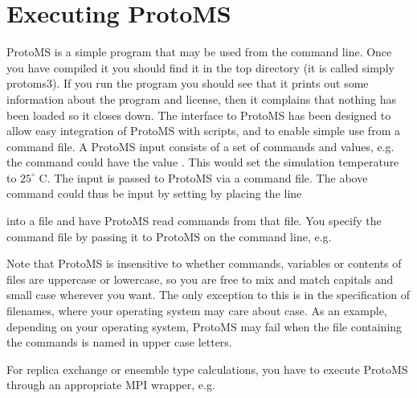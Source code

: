 \documentclass[letterpaper,10pt,english]{sphinxmanual}
\begin{document}
\chapter{Executing ProtoMS}
\label{\detokenize{protoms:executing-protoms}}
ProtoMS is a simple program that may be used from the command line. Once you have compiled it you should find it in the top directory (it is called simply protoms3). If you run the program you should see that it prints out some information about the program and license, then it complains that nothing has been loaded so it closes down. The interface to ProtoMS has been designed to allow easy integration of ProtoMS with scripts, and to enable simple use from a command file. A ProtoMS input consists of a set of commands and values, e.g. the command  could have the value  . This would set the simulation temperature to \(25^\circ\) C. The input is passed to ProtoMS via a command file. The above command could thus be input by setting by placing the line

%
\begin{sphinxVerbatim}[commandchars=\\\{\}]
 
\end{sphinxVerbatim}

into a file and have ProtoMS read commands from that file. You specify the command file by passing it to ProtoMS on the command line, e.g.

%
\begin{sphinxVerbatim}[commandchars=\\\{\}]
 
\end{sphinxVerbatim}

Note that ProtoMS is insensitive to whether commands, variables or contents of files are uppercase or lowercase, so you are free to mix and match capitals and small case wherever you want. The only exception to this is in the specification of filenames, where your operating system may care about case. As an example, depending on your operating system, ProtoMS may fail when the file containing the commands is named in upper case letters.

For replica exchange or ensemble type calculations, you have to execute ProtoMS through an appropriate MPI wrapper, e.g.

%
\begin{sphinxVerbatim}[commandchars=\\\{\}]
    
\end{sphinxVerbatim}
\end{document}
